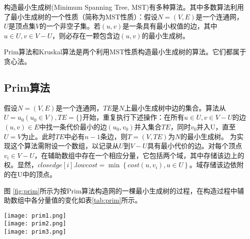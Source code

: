 构造最小生成树(Minimum Spanning Tree, MST)有多种算法。其中多数算法利用了最小生成树的一个性质（简称为MST性质）：假设$N=(V, E)$是一个连通网，$U$是顶点集$V$的一个非空子集。若$(u, v)$是一条具有最小权值的边，其中$u \in U, v \in V-U$，则必存在一颗包含边$(u, v)$的最小生成树。

Prim算法和Kruskal算法是两个利用MST性质构造最小生成树的算法。它们都属于贪心法。

\subsection{Prim算法}
假设$N=(V, E)$是一个连通网，$TE$是$N$上最小生成树中边的集合。算法从$U={u_0}(u_0 \in V), TE=\{\}$开始，重复执行下述操作：在所有$u \in U, v \in V-U$的边$(u, v) \in E$中找一条代价最小的边$(u_0, v_0)$并入集合$TE$，同时$v_0$并入U，直至$U=V$为止。此时$TE$中必有$n-1$条边，则$T=(V, TE)$为$N$的最小生成树。
为实现这个算法需附设一个数组，以记录从$U$到$V-U$具有最小代价的边。对每个顶点$v_i \in V-U$，在辅助数组中存在一个相应分量，它包括两个域，其中存储该边上的权。显然，$closedge[i].lowcost=\min\left\{cost(u, v_i), u \in U\right\}$。域存储该边依附的在U中的顶点。

图 \ref{fig:prim}所示为按Prim算法构造网的一棵最小生成树的过程，在构造过程中辅助数组中各分量值的变化如表\ref{tab:prim}所示。

\begin{center}
\texttt{[image: prim1.png]}\\
\texttt{[image: prim2.png]}\\
\texttt{[image: prim3.png]}\\
\label{fig:prim}
\end{center}

